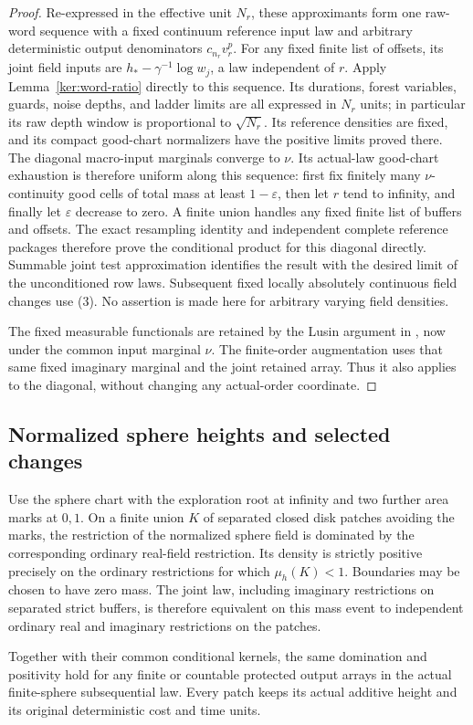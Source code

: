 \begin{proof}
Re-expressed in the effective unit \(N_r\), these approximants form
one raw-word sequence with a fixed continuum reference input law and
arbitrary deterministic output denominators \(c_{n_r}v_r^p\).
For any fixed finite list of offsets, its joint field inputs are
\(h_*-\gamma^{-1}\log w_j\), a law independent of \(r\).
Apply Lemma~\ref{ker:word-ratio} directly to this sequence.
Its durations, forest variables, guards, noise depths, and ladder
limits are all expressed in \(N_r\) units; in particular its raw
depth window is proportional to \(\sqrt{N_r}\).  Its reference densities are
fixed, and its compact good-chart normalizers have the positive
limits proved there.  The diagonal macro-input marginals converge
to \(\nu\).  Its actual-law good-chart exhaustion is therefore
uniform along this sequence: first fix finitely many
\(\nu\)-continuity good cells of total mass at least
\(1-\varepsilon\), then let \(r\) tend to infinity, and
finally let \(\varepsilon\) decrease to zero.  A finite union handles
any fixed finite list of buffers and offsets.  The exact resampling
identity and independent complete reference packages therefore prove
the conditional product for this diagonal directly.  Summable joint
test approximation identifies the result with the desired limit of
the unconditioned row laws.  Subsequent fixed locally absolutely
continuous field changes use (3).  No assertion is
made here for arbitrary varying field densities.

The fixed measurable functionals are retained by the Lusin argument
in , now under the common input marginal
\(\nu\). The finite-order augmentation uses that same fixed imaginary
marginal and the joint retained array. Thus it also applies to the
diagonal, without changing any actual-order coordinate.
\end{proof}

\subsection{Normalized sphere heights and selected changes}

\begin{lemma}\label{ker:sphere-density}
Use the sphere chart with the exploration root at infinity and two
further area marks at \(0,1\).  On a finite union \(K\) of separated
closed disk patches avoiding the marks, the restriction of the
normalized sphere field is dominated by the corresponding ordinary
real-field restriction.  Its density is strictly positive precisely
on the ordinary restrictions for which
\(\mu_h(K)<1\).  Boundaries may be chosen to have zero mass.
The joint law, including imaginary restrictions on separated strict
buffers, is therefore equivalent on this mass event to independent
ordinary real and imaginary restrictions on the patches.

Together with their common conditional kernels, the same domination
and positivity hold for any finite or countable protected output
arrays in the actual finite-sphere subsequential law.  Every patch
keeps its actual additive height and its original deterministic cost
and time units.
\end{lemma}

